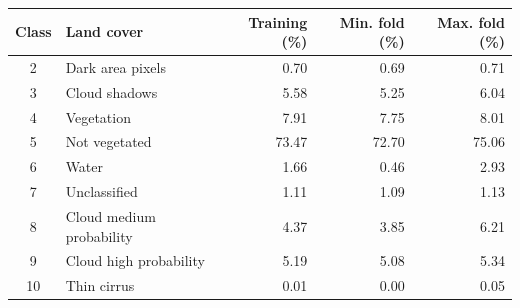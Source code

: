 \begin{tabular}{clrrr}
\toprule
Class & Land cover & Training (\%) & Min. fold (\%) & Max. fold (\%) \\
\midrule
2 & Dark area pixels & 0.70 & 0.69 & 0.71 \\
3 & Cloud shadows & 5.58 & 5.25 & 6.04 \\
4 & Vegetation & 7.91 & 7.75 & 8.01 \\
5 & Not vegetated & 73.47 & 72.70 & 75.06 \\
6 & Water & 1.66 & 0.46 & 2.93 \\
7 & Unclassified & 1.11 & 1.09 & 1.13 \\
8 & Cloud medium probability & 4.37 & 3.85 & 6.21 \\
9 & Cloud high probability & 5.19 & 5.08 & 5.34 \\
10 & Thin cirrus & 0.01 & 0.00 & 0.05 \\
\bottomrule
\end{tabular}
